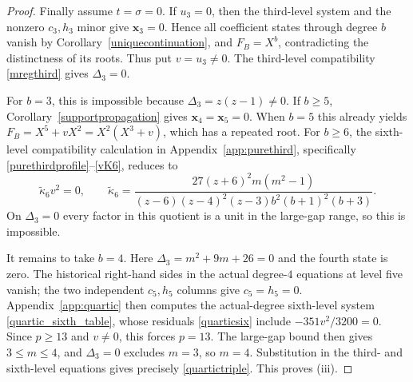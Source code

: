 \documentclass[10pt,a4paper]{amsart}
\begin{document}
\begin{proof}
Finally assume $t=\sigma=0$.  If $u_3=0$, then the third-level system
and the nonzero $c_3,h_3$ minor give $\mathbf x_3=0$.  Hence all
coefficient states through degree $b$ vanish by
Corollary~\ref{uniquecontinuation}, and $F_B=X^b$, contradicting the
distinctness of its roots.  Thus put $v=u_3\ne0$.  The third-level
compatibility \eqref{mregthird} gives $\Delta_3=0$.

For $b=3$, this is impossible because $\Delta_3=z(z-1)\ne0$.  If
$b\ge5$, Corollary~\ref{supportpropagation} gives
$\mathbf x_4=\mathbf x_5=0$.  When $b=5$ this already yields
$F_B=X^5+vX^2=X^2(X^3+v)$, which has a repeated root.  For $b\ge6$, the sixth-level compatibility
calculation in Appendix~\ref{app:purethird}, specifically
\eqref{purethirdprofile}--\eqref{vK6}, reduces to
\[
 \widetilde\kappa_6v^2=0,
 \qquad
 \widetilde\kappa_6=
 \frac{27(z+6)^2m(m^2-1)}
 {(z-6)(z-4)^2(z-3)b^2(b+1)^2(b+3)}.
\]
On $\Delta_3=0$ every factor in this quotient is a unit in the
large-gap range, so this is impossible.

It remains to take $b=4$.  Here $\Delta_3=m^2+9m+26=0$ and the
fourth state is zero.  The historical right-hand sides in the actual
degree-$4$ equations at level five vanish; the two independent
$c_5,h_5$ columns give $c_5=h_5=0$.  Appendix~\ref{app:quartic}
then computes the actual-degree sixth-level system
\eqref{quartic_sixth_table}, whose residuals \eqref{quarticsix} include
$-351v^2/3200=0$.  Since $p\ge13$ and $v\ne0$, this forces $p=13$.  The large-gap bound
then gives $3\le m\le4$, and $\Delta_3=0$ excludes $m=3$, so $m=4$.
Substitution in the third- and sixth-level equations gives precisely
\eqref{quartictriple}.  This proves \textup{(iii)}.
\end{proof}
\end{document}
